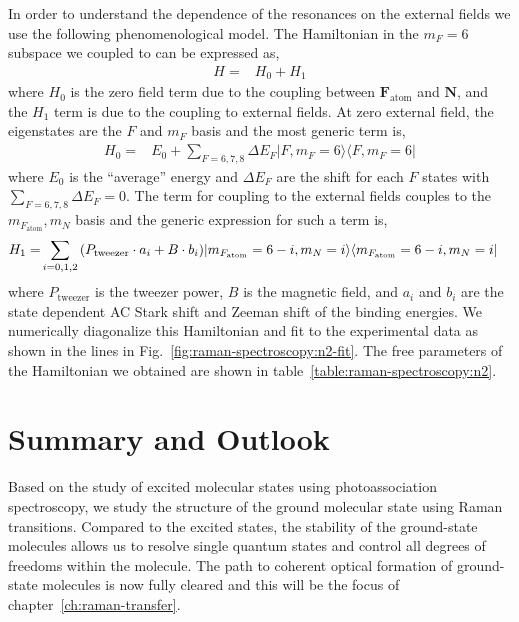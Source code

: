 In order to understand the dependence of the resonances on the external fields
we use the following phenomenological model.
The Hamiltonian in the $m_F=6$ subspace we coupled to can be expressed as,
\begin{align*}
  H=&H_0+H_1
\end{align*}
where $H_0$ is the zero field term due to the coupling
between $\mathbf{F}_{\mathrm{atom}}$ and $\mathbf{N}$,
and the $H_1$ term is due to the coupling to external fields.
At zero external field, the eigenstates are the $F$ and $m_F$ basis
and the most generic term is,
\begin{align*}
  H_0=&E_0+\!\!\sum_{F=6,7,8}\Delta E_F|F,m_F=6\rangle\langle F,m_F=6|
\end{align*}
where $E_0$ is the ``average'' energy and $\Delta E_F$ are the shift for each $F$ states
with $\sum_{F=6,7,8}\Delta E_F = 0$.
The term for coupling to the external fields couples to the $m_{F_\mathrm{atom}},m_N$ basis
and the generic expression for such a term is,
\begin{align*}
  H_1=&\sum_{i=0,1,2}{\left({P_{\mathrm{tweezer}}\cdot a_i+B\cdot b_i}\right)}|m_{F_\mathrm{atom}}=6-i,m_N=i\rangle\langle m_{F_\mathrm{atom}}=6-i,m_N=i|
\end{align*}
where $P_{\mathrm{tweezer}}$ is the tweezer power, $B$ is the magnetic field,
and $a_i$ and $b_i$ are the state dependent AC Stark shift and Zeeman shift
of the binding energies.
We numerically diagonalize this Hamiltonian and fit to the experimental data
as shown in the lines in Fig.~\ref{fig:raman-spectroscopy:n2-fit}.
The free parameters of the Hamiltonian we obtained are shown in
table~\ref{table:raman-spectroscopy:n2}.

\section{Summary and Outlook}
\label{ch:raman-spectroscopy:summary}
Based on the study of excited molecular states using photoassociation spectroscopy,
we study the structure of the ground molecular state using Raman transitions.
Compared to the excited states, the stability of the ground-state molecules
allows us to resolve single quantum states and
control all degrees of freedoms within the molecule.
The path to coherent optical formation of ground-state molecules
is now fully cleared and this will be the focus of chapter~\ref{ch:raman-transfer}.
